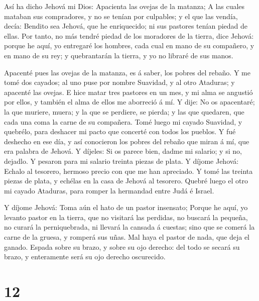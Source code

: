  Así ha dicho Jehová mi Dios: Apacienta las ovejas de la
matanza;  A las cuales mataban sus compradores, y no se
tenían por culpables; y el que las vendía, decía: Bendito sea Jehová,
que he enriquecido; ni sus pastores tenían piedad de ellas. 
Por tanto, no más tendré piedad de los moradores de la tierra, dice
Jehová: porque he aquí, yo entregaré los hombres, cada cual en mano de
su compañero, y en mano de su rey; y quebrantarán la tierra, y yo no
libraré de sus manos.

 Apacenté pues las ovejas de la matanza, es á saber, los
pobres del rebaño. Y me tomé dos cayados; al uno puse por nombre
Suavidad, y al otro Ataduras; y apacenté las ovejas.  E hice
matar tres pastores en un mes, y mi alma se angustió por ellos, y
también el alma de ellos me aborreció á mí.  Y dije: No os
apacentaré; la que muriere, muera; y la que se perdiere, se pierda; y
las que quedaren, que cada una coma la carne de su compañera.
 Tomé luego mi cayado Suavidad, y quebrélo, para deshacer
mi pacto que concerté con todos los pueblos.  Y fué
deshecho en ese día, y así conocieron los pobres del rebaño que miran á
mí, que era palabra de Jehová.  Y díjeles: Si os parece
bien, dadme mi salario; y si no, dejadlo. Y pesaron para mi salario
treinta piezas de plata.  Y díjome Jehová: Echalo al
tesorero, hermoso precio con que me han apreciado. Y tomé las treinta
piezas de plata, y echélas en la casa de Jehová al tesorero.
 Quebré luego el otro mi cayado Ataduras, para romper la
hermandad entre Judá é Israel.

 Y díjome Jehová: Toma aún el hato de un pastor insensato;
 Porque he aquí, yo levanto pastor en la tierra, que no
visitará las perdidas, no buscará la pequeña, no curará la
perniquebrada, ni llevará la cansada á cuestas; sino que se comerá la
carne de la gruesa, y romperá sus uñas.  Mal haya el pastor
de nada, que deja el ganado. Espada sobre su brazo, y sobre su ojo
derecho: del todo se secará su brazo, y enteramente será su ojo derecho
oscurecido.

\hypertarget{section-11}{%
\section{12}\label{section-11}}

